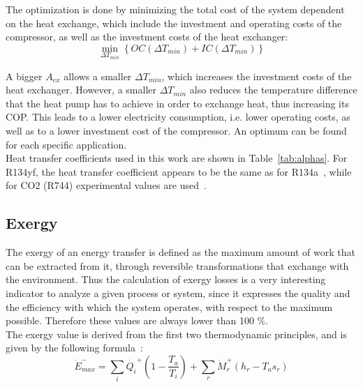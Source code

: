 \documentclass{article}
\begin{document}
The optimization is done by minimizing the total cost of the system dependent on the heat exchange, which include the investment and operating costs of the compressor, as well as the investment costs of the heat exchanger:
\begin{equation}
	\min_{\Delta T_{min}}\left\lbrace OC(\Delta T_{min}) + IC(\Delta T_{min}) \right\rbrace 
\end{equation}

A bigger $A_{ex}$ allows a smaller $\Delta T_{min}$, which increases the investment costs of the heat exchanger. However, a smaller $\Delta T_{min}$ also reduces the temperature difference that the heat pump has to achieve in order to exchange heat, thus increasing its COP. This leads to a lower electricity consumption, i.e. lower operating costs, as well as to a lower investment cost of the compressor. An optimum can be found for each specific application.\\

Heat transfer coefficients used in this work are shown in Table~\ref{tab:alphas}. For R134yf, the heat transfer coefficient appears to be the same as for R134a~\cite{wangOverviewHeatTransfer2013}, while for CO2 (R744) experimental values are used~\cite{ohFlowBoilingHeat2011, mastrulloComparisonR744R134a2009}. \\




\subsection{Exergy}\label{ss:exergy}
The exergy of an energy transfer is defined as the maximum amount of work that can be extracted from it, through reversible transformations that exchange with the environment. Thus the calculation of exergy losses is a very interesting indicator to analyze a given process or system, since it expresses the quality and the efficiency with which the system operates, with respect to the maximum possible. Therefore these values are always lower than 100 \%. \\

The exergy value is derived from the first two thermodynamic principles, and is given by the following formula~\cite{henchozPotentialRefrigerantBased2016}:
\begin{equation}
    \dot{E}^{-}_{max} = \sum_{i} \dot{Q_i}^{+} (1 - \frac{T_{a}}{T_i} ) + \sum_{r} \dot{M}_{r}^{+} (h_{r} - T_{a} s_{r})    
\end{equation}
\end{document}
